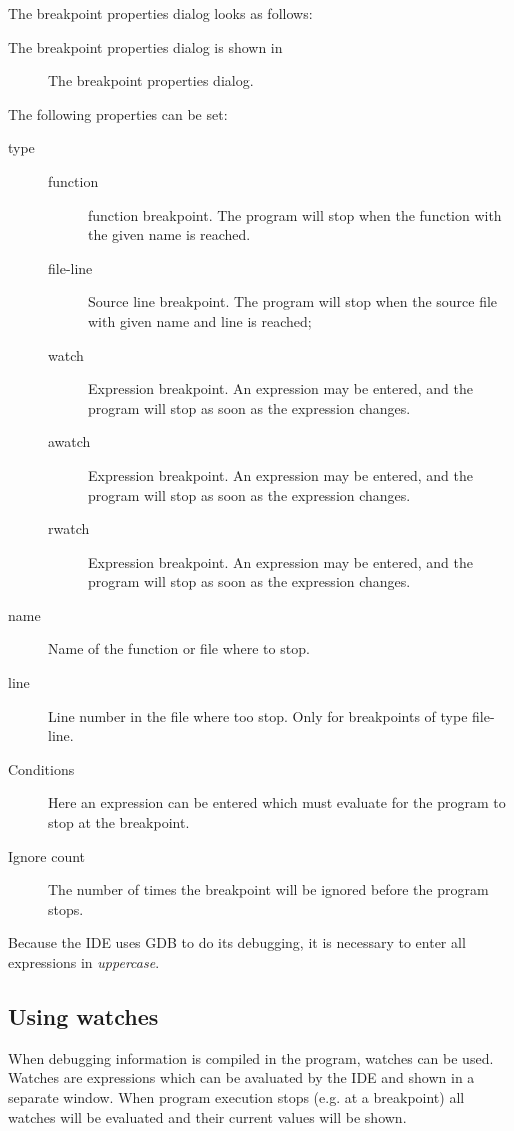 \begin{htmlonly}
The breakpoint properties dialog looks as follows:
\end{htmlonly}
\begin{latexonly}
The breakpoint properties dialog is shown in 
\begin{figure}[ht]
\caption{The breakpoint properties dialog.}\label{fig:brkprop}
\ifpdf
{}
\else
{}
\fi
\end{figure}
\end{latexonly}
The following properties can be set:
\begin{description}
\item[type]
\begin{description}
\item[function] function breakpoint. The program will stop when the function
with the given name is reached.
\item[file-line] Source line breakpoint. The program will stop when the
source file with given name and line is reached;
\item[watch] Expression breakpoint. An expression may be entered, and the
program will stop as soon as the expression changes.
\item[awatch] Expression breakpoint. An expression may be entered, and the
program will stop as soon as the expression changes.
\item[rwatch] Expression breakpoint. An expression may be entered, and the
program will stop as soon as the expression changes.
\end{description}
\item[name] Name of the function or file where to stop.
\item[line] Line number in the file where too stop. Only for breakpoints of
type file-line.
\item[Conditions] Here an expression can be entered which must evaluate 
 for the program to stop at the breakpoint.
\item[Ignore count] The number of times the breakpoint will be ignored
before the program stops.
\end{description}
\begin{remark}
Because the IDE uses GDB to do its debugging, it is necessary to enter all
expressions in {\em uppercase}. 
\end{remark}
%
%
\subsection{Using watches}
When debugging information is compiled in the program, watches can be used.
Watches are expressions which can be avaluated by the IDE and shown in a
separate window. When program execution stops (e.g. at a breakpoint) all
watches will be evaluated and their current values will be shown.

